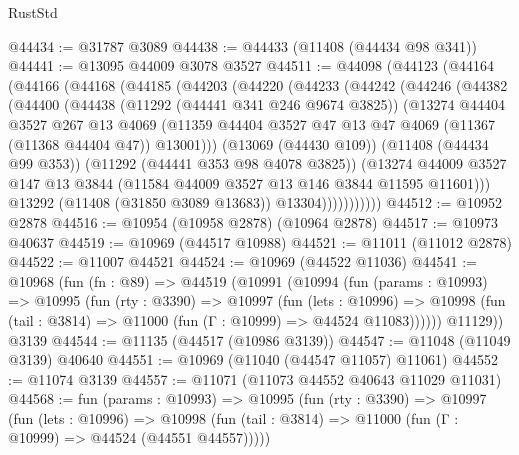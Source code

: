 \begin{lexlean}{RustStd}
\begin{coremodule}
@44434 := @31787 @3089
@44438 := @44433 (@11408 (@44434 @98 @341))
@44441 := @13095 @44009 @3078 @3527
@44511 := @44098
    (@44123
      (@44164
        (@44166
          (@44168
            (@44185
              (@44203
                (@44220
                  (@44233
                    (@44242
                      (@44246
                        (@44382
                          (@44400
                            (@44438
                              (@11292 (@44441 @341 @246 @9674 @3825))
                              (@13274
                                @44404
                                @3527
                                @267
                                @13
                                @4069
                                (@11359
                                  @44404
                                  @3527
                                  @47
                                  @13
                                  @47
                                  @4069
                                  (@11367 (@11368 @44404 @47))
                                  @13001)))
                            (@13069 (@44430 @109))
                            (@11408 (@44434 @99 @353))
                            (@11292 (@44441 @353 @98 @4078 @3825))
                            (@13274
                              @44009
                              @3527
                              @147
                              @13
                              @3844
                              (@11584 @44009 @3527 @13 @146 @3844 @11595 @11601)))
                          @13292
                          (@11408 (@31850 @3089 @13683))
                          @13304)))))))))))
@44512 := @10952 @2878
@44516 := @10954 (@10958 @2878) (@10964 @2878)
@44517 := @10973 @40637
@44519 := @10969 (@44517 @10988)
@44521 := @11011 (@11012 @2878)
@44522 := @11007 @44521
@44524 := @10969 (@44522 @11036)
@44541 := @10968
    (fun (fn : @89) =>
    @44519
      (@10991
        (@10994
          (fun (params : @10993) =>
          @10995
            (fun (rty : @3390) =>
            @10997
              (fun (lets : @10996) =>
              @10998 (fun (tail : @3814) => @11000 (fun (Γ : @10999) => @44524 @11083))))))
        @11129))
    @3139
@44544 := @11135 (@44517 (@10986 @3139))
@44547 := @11048 (@11049 @3139) @40640
@44551 := @10969 (@11040 (@44547 @11057) @11061)
@44552 := @11074 @3139
@44557 := @11071 (@11073 @44552 @40643 @11029 @11031)
@44568 := fun (params : @10993) =>
  @10995
    (fun (rty : @3390) =>
    @10997
      (fun (lets : @10996) =>
      @10998 (fun (tail : @3814) => @11000 (fun (Γ : @10999) => @44524 (@44551 @44557)))))

\end{coremodule}
\end{lexlean}
